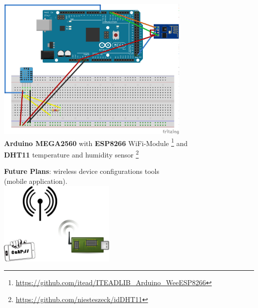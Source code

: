 \documentclass{beamer}
\begin{document}
    \begin{frame}
        \begin{center}
        \includegraphics[width=0.7\textwidth,keepaspectratio]{maket}\\
        \textbf{Arduino MEGA2560} with
        \textbf{ESP8266} WiFi-Module
        \footnote{\url{https://github.com/itead/ITEADLIB_Arduino_WeeESP8266}}
        and \\
        \textbf{DHT11} temperature and humidity sensor
        \footnote{\url{https://github.com/niesteszeck/idDHT11}}
        \end{center}
        
    \end{frame}

    \begin{frame}
        \center\textbf{Future Plans}: wireless device configurations tools\\(mobile application).\\
        \center\includegraphics[height=4cm,keepaspectratio]{configuratorapp}\\
    \end{frame}
\end{document}
